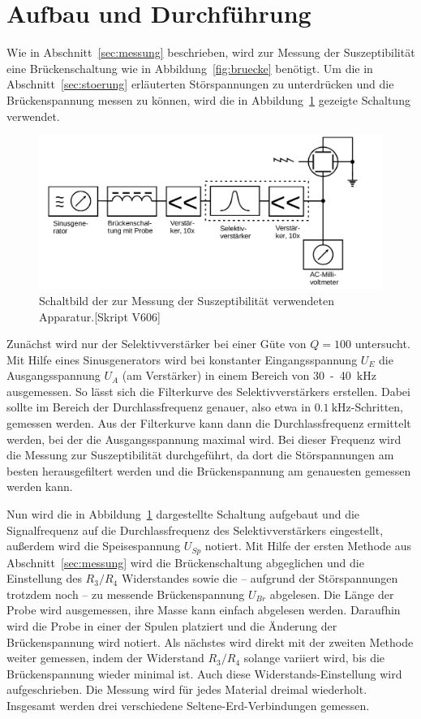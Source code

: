 \newpage
\section{Aufbau und Durchführung}\label{sec:aufbau-und-durchfuehrung}
Wie in Abschnitt~\ref{sec:messung} beschrieben, wird zur Messung der Suszeptibilität eine Brückenschaltung wie in Abbildung~\ref{fig:bruecke} benötigt. Um die in Abschnitt~\ref{sec:stoerung} erläuterten Störspannungen zu unterdrücken und die Brückenspannung messen zu können, wird die in Abbildung~\ref{fig:schaltung} gezeigte Schaltung verwendet.

\begin{figure}[H]
 \centering
 \includegraphics[width=1\textwidth]{../figures/schaltung.png}
 \caption{Schaltbild der zur Messung der Suszeptibilität verwendeten Apparatur.[Skript V606]}
 \label{fig:schaltung}
\end{figure}

Zunächst wird nur der Selektivverstärker bei einer Güte von $Q = 100$ untersucht. Mit Hilfe eines Sinusgenerators wird bei konstanter Eingangsspannung $U_E$ die Ausgangsspannung $U_A$ (am Verstärker) in einem Bereich von 30~-~40~$\si{\kilo\hertz}$ ausgemessen. So lässt sich die Filterkurve des Selektivverstärkers erstellen. Dabei sollte im Bereich der Durchlassfrequenz genauer, also etwa in $\SI{0.1}{\kilo\hertz}$-Schritten, gemessen werden. Aus der Filterkurve kann dann die Durchlassfrequenz ermittelt werden, bei der die Ausgangsspannung maximal wird. Bei dieser Frequenz wird die Messung zur Suszeptibilität durchgeführt, da dort die Störspannungen am besten herausgefiltert werden und die Brückenspannung am genauesten gemessen werden kann.

Nun wird die in Abbildung~\ref{fig:schaltung} dargestellte Schaltung aufgebaut und die Signalfrequenz auf die Durchlassfrequenz des Selektivverstärkers eingestellt, außerdem wird die Speisespannung $U_{Sp}$ notiert.
Mit Hilfe der ersten Methode aus Abschnitt~\ref{sec:messung} wird die Brückenschaltung abgeglichen und die Einstellung des $R_3/R_4$ Widerstandes sowie die -- aufgrund der Störspannungen trotzdem noch -- zu messende Brückenspannung $U_{Br}$ abgelesen. Die Länge der Probe wird ausgemessen, ihre Masse kann einfach abgelesen werden. Daraufhin wird die Probe in einer der Spulen platziert und die Änderung der Brückenspannung wird notiert. Als nächstes wird direkt mit der zweiten Methode weiter gemessen, indem der Widerstand $R_3/R_4$ solange variiert wird, bis die Brückenspannung wieder minimal ist. Auch diese Widerstands-Einstellung wird aufgeschrieben. Die Messung wird für jedes Material dreimal wiederholt. Insgesamt werden drei verschiedene Seltene-Erd-Verbindungen gemessen.

